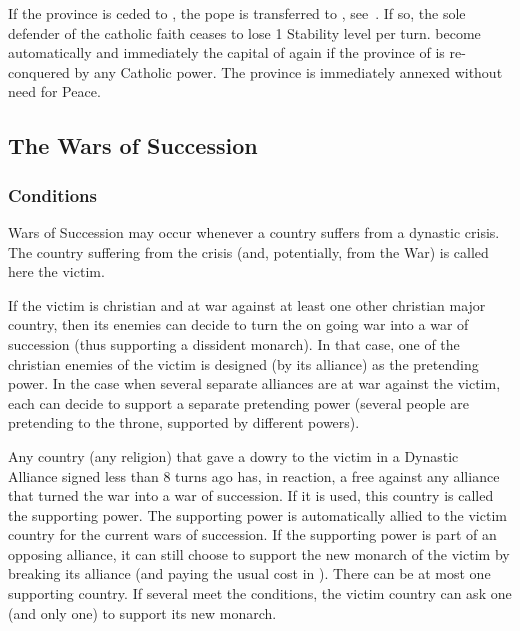 If the province \provinceLazio is ceded to \TUR, the pope is transferred to
\VENven, see~.
\bparag If so, the sole defender of the catholic faith ceases to lose 1
Stability level per turn.
\bparag \villeRoma become automatically and immediately the capital of
\payspapaute again if the province of  is re-conquered by any
Catholic power. The province is immediately annexed without need for Peace.



\subsection{The Wars of Succession}

\label{chSpecific:War of Succession}


\subsubsection{Conditions}
\aparag Wars of Succession may occur whenever a country suffers from a
dynastic crisis. The country suffering from the crisis (and, potentially, from
the War) is called here the victim.

\aparag If the victim is christian and at war against at least one other
christian major country, then its enemies can decide to turn the on going war
into a war of succession (thus supporting a dissident monarch).
\bparag In that case, one of the christian enemies of the victim is designed
(by its alliance) as the pretending power.
\bparag In the case when several separate alliances are at war against the
victim, each can decide to support a separate pretending power (several people
are pretending to the throne, supported by different powers).

\aparag Any country (any religion) that gave a dowry to the victim in a
Dynastic Alliance signed less than 8 turns ago has, in reaction, a free \CB
against any alliance that turned the war into a war of succession. If it is
used, this country is called the supporting power.
\bparag The supporting power is automatically allied to the victim country for
the current wars of succession.
\bparag If the supporting power is part of an opposing alliance, it can still
choose to support the new monarch of the victim by breaking its alliance (and
paying the usual cost in \STAB).
\bparag There can be at most one supporting country. If several meet the
conditions, the victim country can ask one (and only one) to support its new
monarch.

